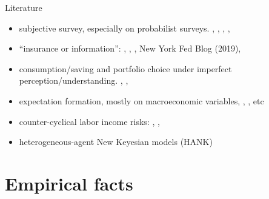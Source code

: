 \documentclass{beamer}
\begin{document}
\begin{frame}{Literature}
\begin{itemize}
	 \item subjective survey, especially on probabilist surveys.  \cite{manski_measuring_2004}, \cite{delavande2011measuring}, \cite{manski_survey_2018},  \cite{bertrand_people_2001}, \cite{armantier_overview_2017}
	\item ``insurance or information'':  \cite{kaufmann_disentangling_2009},  \cite{meghir2011earnings}, \cite{pistaferri_superior_2001}, New York Fed Blog (2019),  \cite{flavin_excess_1988}
   \item consumption/saving and portfolio choice under imperfect perception/understanding. \cite{rozsypal_overpersistence_2017}, \cite{carroll_sticky_2018}, \cite{lian2019imperfect}
   \item expectation formation, mostly on macroeconomic variables, \cite{coibion2012can}, \cite{fuhrer2018intrinsic}, etc

   \item counter-cyclical labor income risks: \cite{storesletten2004cyclical}, \cite{guvenen2014nature}, \cite{catherine_countercyclical_2019}
      \item heterogeneous-agent New Keyesian models (HANK)
  \end{itemize}
\end{frame}

\section{Empirical facts}
\end{document}

